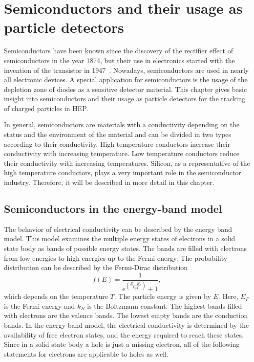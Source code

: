 \acresetall
\chapter{Semiconductors and their usage as particle detectors}\label{cha:semi-conductors}
Semiconductors have been known since the discovery of the rectifier effect of semiconductors in the year 1874, but their use in electronics started with the invention of the transistor in 1947~\cite{Bar48}. Nowadays, semiconductors are used in nearly all electronic devices. A special application for semiconductors is the usage of the depletion zone of diodes as a sensitive detector material. This chapter gives basic insight into semiconductors and their usage as particle detectors for the tracking of charged particles in \ac{HEP}.

In general, semiconductors are materials with a conductivity depending on the status and the environment of the material and can be divided in two types according to their conductivity. High temperature conductors increase their conductivity with increasing temperature. Low temperature conductors reduce their conductivity with increasing temperatures. Silicon, as a representative of the high temperature conductors, plays a very important role in the semiconductor industry. Therefore, it will be described in more detail in this chapter.
\section{Semiconductors in the energy-band model}
The behavior of electrical conductivity can be described by the energy band model. This model examines the multiple energy states of electrons in a solid state body as bands of possible energy states. The bands are filled with electrons from low energies to high energies up to the Fermi energy. The probability distribution can be described by the Fermi-Dirac distribution
\begin{equation}
f(E)=\frac{1}{e^{\left( \frac{E-E_F}{k_B T} \right)} +1},
\end{equation}
which depends on the temperature $T$. The particle energy is given by $E$. Here, $E_F$ is the Fermi energy and $k_B$ is the Boltzmann-constant. The highest bands filled with electrons are the valence bands. The lowest empty bands are the conduction bands. In the energy-band model, the electrical conductivity is determined by the availability of free electron states, and the energy required to reach these states. Since in a solid state body a hole is just a missing electron, all of the following statements for electrons are applicable to holes as well.

